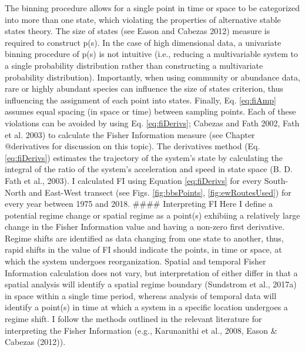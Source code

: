 \documentclass[12pt,twoside,openany]{reedthesis}
\begin{document}
The binning procedure allows for a single point in time or space to be
categorized into more than one state, which violating the properties of
alternative stable states theory. The size of states (see Eason and
Cabezas 2012) measure is required to construct p(s). In the case of high
dimensional data, a univariate binning procedure of p(s) is not
intuitive (i.e., reducing a multivariable system to a single probability
distribution rather than constructing a multivariate probability
distribution). Importantly, when using community or abundance data, rare
or highly abundant species can influence the size of states criterion,
thus influencing the assignment of each point into states. Finally, Eq.
\eqref{eq:fiAmp} assumes equal spacing (in space or time) between sampling
points. Each of these violations can be avoided by using Eq.
\eqref{eq:fiDerivs}; Cabezas and Fath 2002, Fath et al. 2003) to calculate
the Fisher Information measure (see Chapter @derivatives for discussion
on this topic). The derivatives method (Eq. \eqref{eq:fiDerivs}) estimates
the trajectory of the system's state by calculating the integral of the
ratio of the system's acceleration and speed in state space (B. D. Fath
et al., 2003). I calculated FI using Equation \eqref{eq:fiDerivs} for
every South-North and East-West transect (see Figs. \ref{fig:bbsPoints},
\ref{fig:ewRoutesUsed}) for every year between 1975 and 2018. \#\#\#\#
Interpreting FI Here I define a potential regime change or spatial
regime as a point(s) exhibiing a relatively large change in the Fisher
Information value and having a non-zero first derivative. Regime shifts
are identified as data changing from one state to another, thus, rapid
shifts in the value of FI should indicate the points, in time or space,
at which the system undergoes reorganization. Spatial and temporal
Fisher Information calculation does not vary, but interpretation of
either differ in that a spatial analysis will identify a spatial regime
boundary (Sundstrom et al., 2017a) in space within a single time period,
whereas analysis of temporal data will identify a point(s) in time at
which a system in a specific location undergoes a regime shift. I follow
the methods outlined in the relevant literature for interpreting the
Fisher Information (e.g., Karunanithi et al., 2008, Eason \& Cabezas
(2012)).
\end{document}
